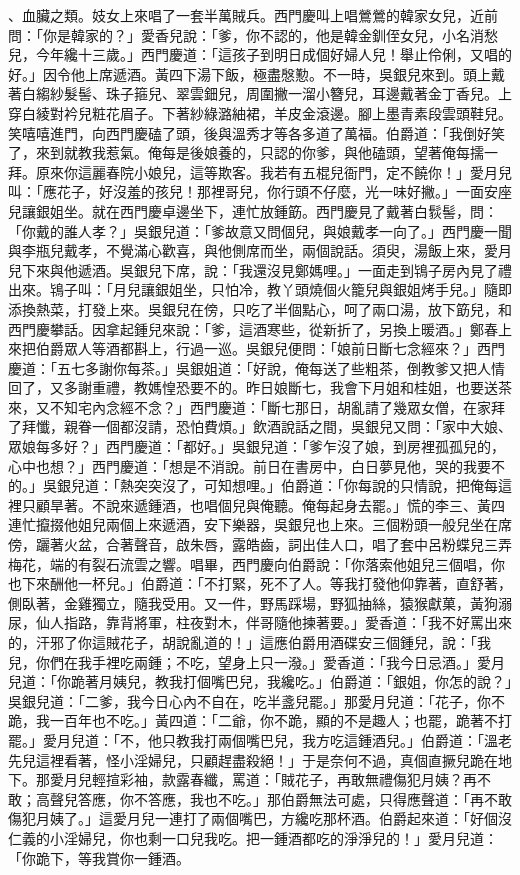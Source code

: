 、血臟之類。妓女上來唱了一套半萬賊兵。西門慶叫上唱鶯鶯的韓家女兒，近前問：「你是韓家的？」愛香兒說：「爹，你不認的，他是韓金釧侄女兒，小名消愁兒，今年纔十三歲。」西門慶道：「這孩子到明日成個好婦人兒！舉止伶俐，又唱的好。」因令他上席遞酒。黃四下湯下飯，極盡慇懃。不一時，吳銀兒來到。頭上戴著白縐紗髮髻、珠子箍兒、翠雲鈿兒，周圍撇一溜小簪兒，耳邊戴著金丁香兒。上穿白綾對衿兒粧花眉子。下著紗綠潞紬裙，羊皮金滾邊。腳上墨青素段雲頭鞋兒。笑嘻嘻進門，向西門慶磕了頭，後與溫秀才等各多道了萬福。伯爵道：「我倒好笑了，來到就教我惹氣。俺每是後娘養的，只認的你爹，與他磕頭，望著俺每擩一拜。原來你這麗春院小娘兒，這等欺客。我若有五棍兒衙門，定不饒你！」愛月兒叫：「應花子，好沒羞的孩兒！那裡哥兒，你行頭不仔麼，光一味好撇。」一面安座兒讓銀姐坐。就在西門慶卓邊坐下，連忙放鍾筯。西門慶見了戴著白䯼髻，問：「你戴的誰人孝？」吳銀兒道：「爹故意又問個兒，與娘戴孝一向了。」西門慶一聞與李瓶兒戴孝，不覺滿心歡喜，與他側席而坐，兩個說話。須臾，湯飯上來，愛月兒下來與他遞酒。吳銀兒下席，說：「我還沒見鄭媽哩。」一面走到鴇子房內見了禮出來。鴇子叫：「月兒讓銀姐坐，只怕冷，教丫頭燒個火籠兒與銀姐烤手兒。」隨即添換熱菜，打發上來。吳銀兒在傍，只吃了半個點心，呵了兩口湯，放下筯兒，和西門慶攀話。因拿起鍾兒來說：「爹，這酒寒些，從新折了，另換上暖酒。」鄭春上來把伯爵眾人等酒都斟上，行過一巡。吳銀兒便問：「娘前日斷七念經來？」西門慶道：「五七多謝你每茶。」吳銀姐道：「好說，俺每送了些粗茶，倒教爹又把人情回了，又多謝重禮，教媽惶恐要不的。昨日娘斷七，我會下月姐和桂姐，也要送茶來，又不知宅內念經不念？」西門慶道：「斷七那日，胡亂請了幾眾女僧，在家拜了拜懺，親眷一個都沒請，恐怕費煩。」飲酒說話之間，吳銀兒又問：「家中大娘、眾娘每多好？」西門慶道：「都好。」吳銀兒道：「爹乍沒了娘，到房裡孤孤兒的，心中也想？」西門慶道：「想是不消說。前日在書房中，白日夢見他，哭的我要不的。」吳銀兒道：「熱突突沒了，可知想哩。」伯爵道：「你每說的只情說，把俺每這裡只顧旱著。不說來遞鍾酒，也唱個兒與俺聽。俺每起身去罷。」慌的李三、黃四連忙攛掇他姐兒兩個上來遞酒，安下樂器，吳銀兒也上來。三個粉頭一般兒坐在席傍，躧著火盆，合著聲音，啟朱唇，露皓齒，詞出佳人口，唱了套中呂粉蝶兒三弄梅花，端的有裂石流雲之響。唱畢，西門慶向伯爵說：「你落索他姐兒三個唱，你也下來酬他一杯兒。」伯爵道：「不打緊，死不了人。等我打發他仰靠著，直舒著，側臥著，金雞獨立，隨我受用。又一件，野馬踩場，野狐抽絲，猿猴獻菓，黃狗溺尿，仙人指路，靠背將軍，柱夜對木，伴哥隨他揀著要。」愛香道：「我不好罵出來的，汗邪了你這賊花子，胡說亂道的！」這應伯爵用酒碟安三個鍾兒，說：「我兒，你們在我手裡吃兩鍾；不吃，望身上只一潑。」愛香道：「我今日忌酒。」愛月兒道：「你跪著月姨兒，教我打個嘴巴兒，我纔吃。」伯爵道：「銀姐，你怎的說？」吳銀兒道：「二爹，我今日心內不自在，吃半盞兒罷。」那愛月兒道：「花子，你不跪，我一百年也不吃。」黃四道：「二爺，你不跪，顯的不是趣人；也罷，跪著不打罷。」愛月兒道：「不，他只教我打兩個嘴巴兒，我方吃這鍾酒兒。」伯爵道：「溫老先兒這裡看著，怪小淫婦兒，只顧趕盡殺絕！」于是奈何不過，真個直撅兒跪在地下。那愛月兒輕揎彩袖，款露春纖，罵道：「賊花子，再敢無禮傷犯月姨？再不敢；高聲兒答應，你不答應，我也不吃。」那伯爵無法可處，只得應聲道：「再不敢傷犯月姨了。」這愛月兒一連打了兩個嘴巴，方纔吃那杯酒。伯爵起來道：「好個沒仁義的小淫婦兒，你也剩一口兒我吃。把一鍾酒都吃的淨淨兒的！」愛月兒道：「你跪下，等我賞你一鍾酒。